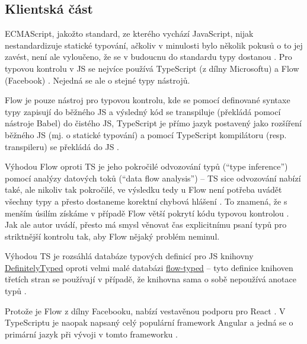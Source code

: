 \subsection{Klientská část}\label{subsec:types-frontend}

ECMAScript, jakožto standard, ze kterého vychází JavaScript, nijak nestandardizuje statické typování, ačkoliv v minulosti bylo několik pokusů o to jej zavést, není ale vyloučeno, že se v budoucnu do standardu typy dostanou \cite{types-ecma}. Pro typovou kontrolu v JS se nejvíce používá TypeScript (z dílny Microsoftu) a Flow (Facebook) \cite{types-objectcomputing}. Nejedná se ale o stejné typy nástrojů.

Flow je pouze nástroj pro typovou kontrolu, kde se pomocí definované syntaxe typy zapisují do běžného JS a výsledný kód se transpiluje (překládá pomocí nástroje Babel) do čistého JS, TypeScript je přímo jazyk postavený jako rozšíření běžného JS (mj. o statické typování) a pomocí TypeScript kompilátoru (resp. transpileru) se překládá do JS \cite{types-mariusschulz, types-objectcomputing}. 

Výhodou Flow oproti TS je jeho pokročilé odvozování typů (\enquote{type inference}) pomocí analýzy datových toků (\enquote{data flow analysis}) -- TS sice odvozování nabízí také, ale nikoliv tak pokročilé, ve výsledku tedy u Flow není potřeba uvádět všechny typy a přesto dostaneme korektní chybová hlášení \cite{types-objectcomputing, types-medium}. To znamená, že s menším úsilím získáme v případě Flow větší pokrytí kódu typovou kontrolou \cite{types-jamie}. Jak ale autor \cite{types-medium} uvádí, přesto má smysl věnovat čas explicitnímu psaní typů pro striktnější kontrolu tak, aby Flow nějaký problém neminul. 

Výhodou TS je rozsáhlá databáze typových definicí pro JS knihovny \href{https://github.com/DefinitelyTyped/DefinitelyTyped}{DefinitelyTyped} oproti velmi malé databázi \href{https://github.com/flow-typed/flow-typed}{flow-typed} -- tyto definice knihoven třetích stran se používají v případě, že knihovna sama o sobě nepoužívá anotace typů \cite{types-objectcomputing}. 

Protože je Flow z dílny Facebooku, nabízí vestavěnou podporu pro React \cite{types-objectcomputing}. V TypeScriptu je naopak napsaný celý populární framework Angular a jedná se o primární jazyk při vývoji v tomto frameworku \cite{types-angular}.

